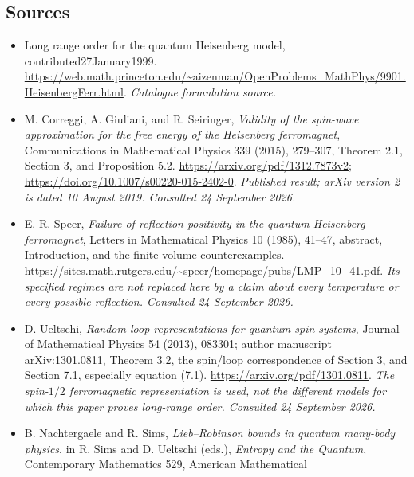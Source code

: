 \documentclass[11pt]{article}
\begin{document}
	\subsection{Sources}
	\begin{itemize}\raggedright
		\item[\textnormal{[S1]}]\hypertarget{source:202:1}{} Long range order for the quantum Heisenberg model, contributed27January1999.
		\url{https://web.math.princeton.edu/~aizenman/OpenProblems_MathPhys/9901.HeisenbergFerr.html}.
		{\small\textit{Catalogue formulation source.}}
		\item[\textnormal{[E1]}]\hypertarget{extra:202:1}{}
		M. Correggi, A. Giuliani, and R. Seiringer, \emph{Validity of the
			spin-wave approximation for the free energy of the Heisenberg
			ferromagnet}, Communications in Mathematical Physics 339 (2015),
		279--307, Theorem 2.1, Section 3, and Proposition 5.2.
		\url{https://arxiv.org/pdf/1312.7873v2};
		\url{https://doi.org/10.1007/s00220-015-2402-0}.
		{\small\textit{Published result; arXiv version 2 is dated 10 August 2019.
				Consulted 24 September 2026.}}
		\item[\textnormal{[E2]}]\hypertarget{extra:202:2}{}
		E. R. Speer, \emph{Failure of reflection positivity in the quantum
			Heisenberg ferromagnet}, Letters in Mathematical Physics 10 (1985),
		41--47, abstract, Introduction, and the finite-volume counterexamples.
		\url{https://sites.math.rutgers.edu/~speer/homepage/pubs/LMP_10_41.pdf}.
		{\small\textit{Its specified regimes are not replaced here by a claim
				about every temperature or every possible reflection. Consulted
				24 September 2026.}}
		\item[\textnormal{[E3]}]\hypertarget{extra:202:3}{}
		D. Ueltschi, \emph{Random loop representations for quantum spin systems},
		Journal of Mathematical Physics 54 (2013), 083301; author manuscript
		arXiv:1301.0811, Theorem 3.2, the spin/loop correspondence of Section 3,
		and Section 7.1, especially equation (7.1).
		\url{https://arxiv.org/pdf/1301.0811}.
		{\small\textit{The spin-$1/2$ ferromagnetic representation is used, not
				the different models for which this paper proves long-range order.
				Consulted 24 September 2026.}}
		\item[\textnormal{[E4]}]\hypertarget{extra:202:4}{}
		B. Nachtergaele and R. Sims, \emph{Lieb--Robinson bounds in quantum
			many-body physics}, in R. Sims and D. Ueltschi (eds.), \emph{Entropy
			and the Quantum}, Contemporary Mathematics 529, American Mathematical

\end{itemize}
\end{document}
